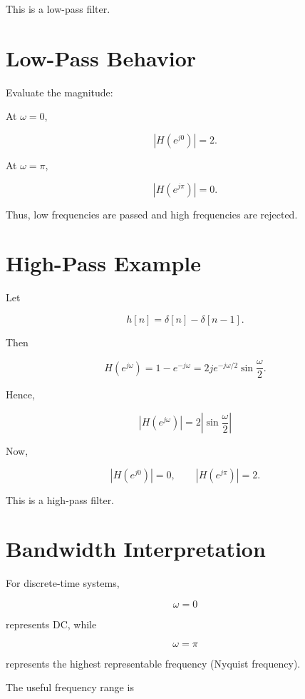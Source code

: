 This is a low-pass filter.


\section{Low-Pass Behavior}

Evaluate the magnitude:

At \(\omega=0\),

\[
|H(e^{j0})|=2.
\]

At \(\omega=\pi\),

\[
|H(e^{j\pi})|=0.
\]

Thus, low frequencies are passed and high frequencies are rejected.


\section{High-Pass Example}

Let

\[
h[n]=\delta[n]-\delta[n-1].
\]

Then

\[
H(e^{j\omega})=
1-e^{-j\omega}
=
2je^{-j\omega/2}\sin\frac{\omega}{2}.
\]

Hence,

\[
\boxed{
|H(e^{j\omega})|=
2\left|\sin\frac{\omega}{2}\right|
}
\]

Now,

\[
|H(e^{j0})|=0,
\qquad
|H(e^{j\pi})|=2.
\]

This is a high-pass filter.


\section{Bandwidth Interpretation}

For discrete-time systems,

\[
\omega=0
\]

represents DC, while

\[
\omega=\pi
\]

represents the highest representable frequency (Nyquist frequency).

The useful frequency range is

